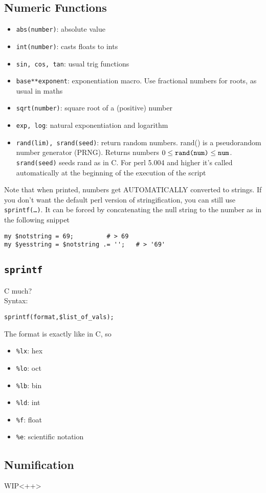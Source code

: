 \documentclass{article}
\begin{document}
\subsection{Numeric Functions}
\begin{itemize}
\item \texttt{abs(number)}: absolute value
\item \texttt{int(number)}: casts floats to ints
\item \texttt{sin, cos, tan}: usual trig functions
\item \texttt{base**exponent}: exponentiation macro. Use fractional numbers for roots, as usual in maths
\item \texttt{sqrt(number)}: square root of a (positive) number
\item \texttt{exp, log}: natural exponentiation and logarithm
\item \texttt{rand(lim), srand(seed)}: return random numbers. rand() is a pseudorandom number generator (PRNG). Returns numbers $0\le\text{\texttt{rand(num)}}\le\texttt{num}$. \texttt{srand(seed)} seeds rand as in C. For perl 5.004 and higher it's called automatically at the beginning of the execution of the script
\end{itemize}
Note that when printed, numbers get AUTOMATICALLY converted to strings. If you don't want the default perl version of stringification, you can still use \texttt{sprintf(\ldots)}. It can be forced by concatenating the null string to the number as in the following snippet
\begin{verbatim}
my $notstring = 69;			# > 69
my $yesstring = $notstring .= '';	# > '69'
\end{verbatim}
\subsection{\texttt{sprintf}}
C much?\\
Syntax:
\begin{verbatim}
sprintf(format,$list_of_vals);
\end{verbatim}
The format is exactly like in C, so
\begin{itemize}
\item \texttt{\%lx}: hex
\item \texttt{\%lo}: oct
\item \texttt{\%lb}: bin
\item \texttt{\%ld}: int
\item \texttt{\%f}: float
\item \texttt{\%e}: scientific notation
\end{itemize}
\subsection{Numification}
WIP<++>
\end{document}
